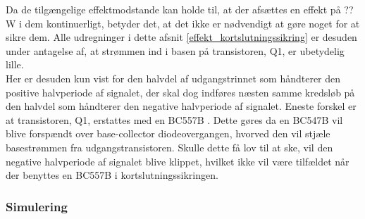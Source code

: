 Da de tilgængelige effektmodstande kan holde til, at der afsættes en effekt på ?? W i dem kontinuerligt, betyder det, at det ikke er nødvendigt at gøre noget for at sikre dem. Alle udregninger i dette afsnit \ref{effekt_kortslutningssikring} er desuden under antagelse af, at strømmen ind i basen på transistoren, Q1, er ubetydelig lille.\\
Her er desuden kun vist for den halvdel af udgangstrinnet som håndterer den positive halvperiode af signalet, der skal dog indføres næsten samme kredsløb på den halvdel som håndterer den negative halvperiode af signalet. Eneste forskel er at transistoren, Q1, erstattes med en BC557B . Dette gøres da en BC547B vil blive forspændt over base-collector diodeovergangen, hvorved den vil stjæle basestrømmen fra udgangstransistoren. Skulle dette få lov til at ske, vil den negative halvperiode af signalet blive klippet, hvilket ikke vil være tilfældet når der benyttes en BC557B i kortslutningssikringen. 

\subsubsection*{Simulering}